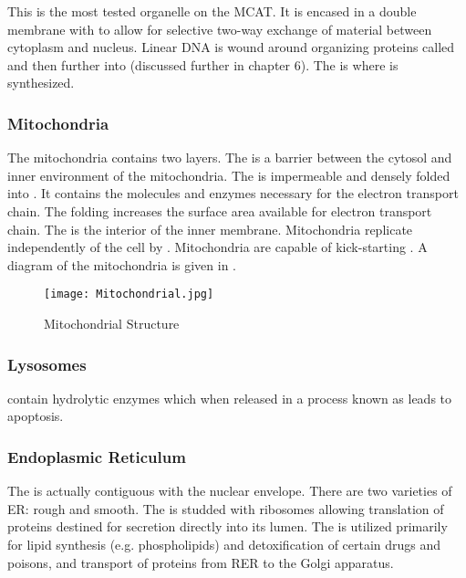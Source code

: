 \documentclass[../Bio_chemistryReview.tex]{subfiles}
\begin{document}
This is the most tested organelle on the MCAT. It is encased in a double
membrane with  to allow for selective two-way exchange of
material between cytoplasm and nucleus. Linear DNA is wound around organizing
proteins called  and then further into 
(discussed further in chapter 6). The  is where
 is synthesized.

\subsubsection{Mitochondria\supdag}

The mitochondria contains two layers. The  is a barrier
between the cytosol and inner environment of the mitochondria. The
 is impermeable and densely folded into
. It contains the molecules and enzymes necessary for the
electron transport chain. The folding increases the surface area available for
electron transport chain. The  is the interior of the inner
membrane. Mitochondria replicate independently of the cell by . Mitochondria are capable of kick-starting . A
diagram of the mitochondria is given in .
\begin{figure}[H] 
  \centering
  \texttt{[image: Mitochondrial.jpg]} 
  \caption{Mitochondrial Structure}
  \label{fig:Mitochondrial Structure}
\end{figure}

\subsubsection{Lysosomes\supdag}

 contain hydrolytic enzymes which when released in a process
known as  leads to apoptosis.

\subsubsection{Endoplasmic Reticulum\supdag}

The  is actually contiguous with the nuclear
envelope. There are two varieties of ER: rough and smooth. The
 is studded with ribosomes allowing
translation of proteins destined for secretion directly into its lumen. The
 is utilized primarily for lipid synthesis (e.g.
phospholipids) and detoxification of certain drugs and poisons, and transport of
proteins from RER to the Golgi apparatus.
\end{document}
